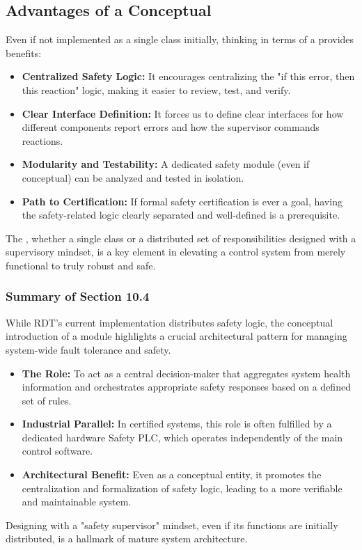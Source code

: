 \subsection{Advantages of a Conceptual }
\label{subsec:safety_supervisor_advantages}
Even if not implemented as a single class initially, thinking in terms of a  provides benefits:

\begin{itemize}
    \item \textbf{Centralized Safety Logic:} It encourages centralizing the "if this error, then this reaction" logic, making it easier to review, test, and verify.
    \item \textbf{Clear Interface Definition:} It forces us to define clear interfaces for how different components report errors and how the supervisor commands reactions.
    \item \textbf{Modularity and Testability:} A dedicated safety module (even if conceptual) can be analyzed and tested in isolation.
    \item \textbf{Path to Certification:} If formal safety certification is ever a goal, having the safety-related logic clearly separated and well-defined is a prerequisite.
\end{itemize}

The , whether a single class or a distributed set of responsibilities designed with a supervisory mindset, is a key element in elevating a control system from merely functional to truly robust and safe.

\subsubsection{Summary of Section 10.4}
\label{subsubsec:section10_4_summary}
While RDT's current implementation distributes safety logic, the conceptual introduction of a  module highlights a crucial architectural pattern for managing system-wide fault tolerance and safety.
\begin{itemize}
    \item \textbf{The Role:} To act as a central decision-maker that aggregates system health information and orchestrates appropriate safety responses based on a defined set of rules.
    \item \textbf{Industrial Parallel:} In certified systems, this role is often fulfilled by a dedicated hardware Safety PLC, which operates independently of the main control software.
    \item \textbf{Architectural Benefit:} Even as a conceptual entity, it promotes the centralization and formalization of safety logic, leading to a more verifiable and maintainable system.
\end{itemize}
Designing with a "safety supervisor" mindset, even if its functions are initially distributed, is a hallmark of mature system architecture.






